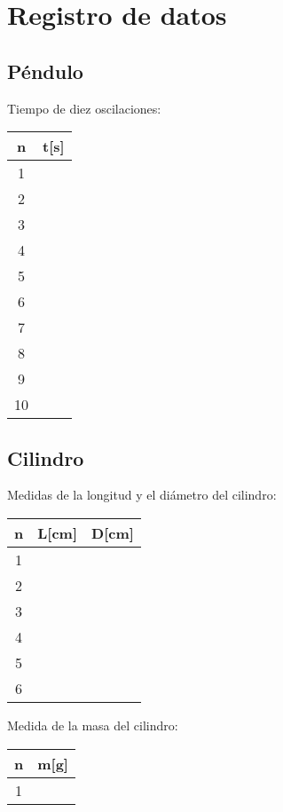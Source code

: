 \documentclass[letter,11pt]{article}
\begin{document}
\section{Registro de datos}
\subsection{Péndulo}
Tiempo de diez oscilaciones: \\
\begin{center}
\begin{tabular}{|c|>{\centering}m{3.0cm}<{\centering}|}
\hline
\textbf{n} & \textbf{t[s]} \tabularnewline \hline
1 & \\ \hline
2 & \\ \hline
3 & \\ \hline
4 & \\ \hline
5 & \\ \hline
6 & \\ \hline
7 & \\ \hline
8 & \\ \hline
9 & \\ \hline
10 & \\ \hline
\end{tabular}
\end{center}

\subsection{Cilindro}
Medidas de la longitud y el diámetro del cilindro:
\begin{center}
\begin{tabular}{|c|>{\centering}m{3.0cm}<{\centering}
                  |>{\centering}m{3.0cm}<{\centering}|}
\hline
\textbf{n} & \textbf{L[cm]} & \textbf{D[cm]} \tabularnewline \hline
1 & & \\ \hline
2 & & \\ \hline
3 & & \\ \hline
4 & & \\ \hline
5 & & \\ \hline
6 & & \\
\hline
\end{tabular}
\end{center}
\vspace{0.5cm}
Medida de la masa del cilindro:
\begin{center}
\begin{tabular}{|c|>{\centering}m{3.0cm}<{\centering}|}
\hline
\textbf{n} & \textbf{m[g]} \tabularnewline \hline
1 & \\
\hline
\end{tabular}
\end{center}
\end{document}
